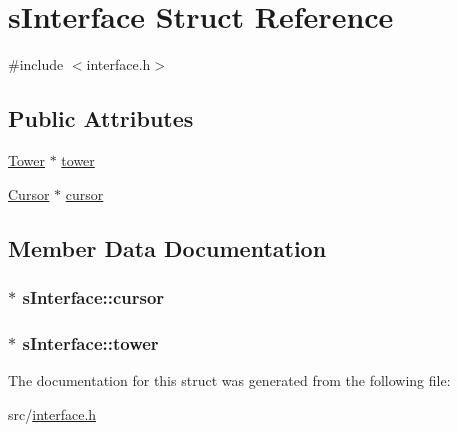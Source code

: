 \hypertarget{structs_interface}{}\section{s\+Interface Struct Reference}
\label{structs_interface}


{\ttfamily \#include $<$interface.\+h$>$}

\subsection*{Public Attributes}
\begin{DoxyCompactItemize}
\item 
\hyperlink{tower_8h_a5070e945849fb8f0b9f8e9049b7434ba}{Tower} $\ast$ \hyperlink{structs_interface_a0cc8cc4aba1cc271d3741d832504d202}{tower}
\item 
\hyperlink{interface_8h_a2cc6eac3d76a3bead2da75d8bcd3ef05}{Cursor} $\ast$ \hyperlink{structs_interface_a8acbf9a94800605031c055fc69b53d26}{cursor}
\end{DoxyCompactItemize}


\subsection{Member Data Documentation}
\hypertarget{structs_interface_a8acbf9a94800605031c055fc69b53d26}{}
\subsubsection[{cursor}]{$\ast$ s\+Interface\+::cursor}\label{structs_interface_a8acbf9a94800605031c055fc69b53d26}
\hypertarget{structs_interface_a0cc8cc4aba1cc271d3741d832504d202}{}
\subsubsection[{tower}]{$\ast$ s\+Interface\+::tower}\label{structs_interface_a0cc8cc4aba1cc271d3741d832504d202}


The documentation for this struct was generated from the following file\+:\begin{DoxyCompactItemize}
\item 
src/\hyperlink{interface_8h}{interface.\+h}\end{DoxyCompactItemize}
